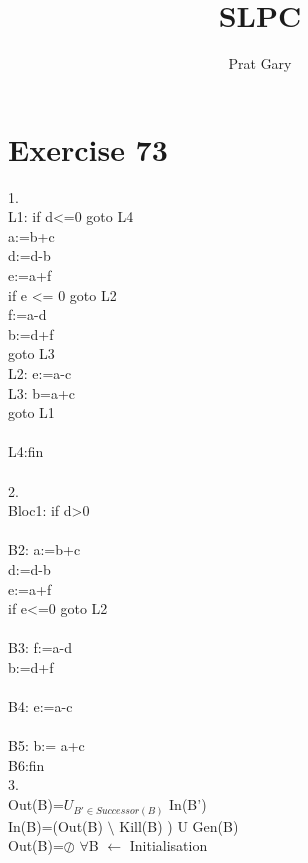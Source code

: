 \documentclass[10pt,a4paper]{article}
\author{Prat Gary}
\title{SLPC}
\begin{document}
\maketitle

\section{Exercise 73}

{\large 1.} \\
L1: if d<=0 goto L4\\
a:=b+c\\
d:=d-b\\
e:=a+f\\
if e <= 0 goto L2\\
f:=a-d\\
b:=d+f\\
goto L3\\
L2: e:=a-c\\
L3: b=a+c\\
goto L1\\
\\
L4:fin
\\
\\

{\large 2.} \\
Bloc1: if d>0\\\\
B2: a:=b+c\\
d:=d-b\\
e:=a+f\\
if e<=0 goto L2\\
\\
B3: f:=a-d\\
b:=d+f\\\\
B4: e:=a-c\\\\
B5: b:= a+c\\
B6:fin\\

{\large 3.}\\
Out(B)=$U_{B' \in Successor(B)}$  In(B')\\
In(B)=(Out(B) $\setminus$ Kill(B) ) U Gen(B)\\
Out(B)=$\oslash$ $\forall$B $\leftarrow$ Initialisation\\
\end{document}
